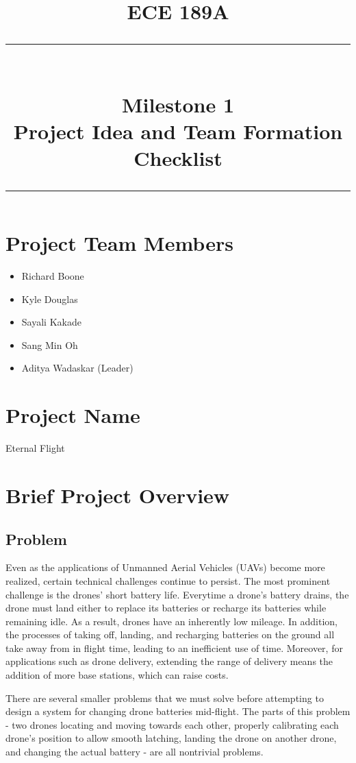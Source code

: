 \documentclass[paper=a4, fontsize=12pt]{scrartcl}
\title{
		\vspace{-0.5in} 	
		\usefont{OT1}{bch}{b}{n}
		\normalfont \normalsize \textsc{ECE 189A} \\ [10pt]
		\rule{\linewidth}{2pt} \\ [0.4cm]
		\huge Milestone 1 \\
		\Large Project Idea and Team Formation Checklist
		\rule{\linewidth}{2pt}
}
\author{
}
\date{}
\begin{document}
\maketitle


\vspace{-1in}
\section{Project Team Members}
\begin{itemize}
	\item Richard Boone
	\item Kyle Douglas
	\item Sayali Kakade
	\item Sang Min Oh
	\item Aditya Wadaskar (Leader)
\end{itemize}

\section{Project Name}
Eternal Flight

\section{Brief Project Overview}
\subsection{Problem}
Even as the applications of Unmanned Aerial Vehicles (UAVs) become more realized, certain technical challenges continue to persist. 
The most prominent challenge is the drones' short battery life. 
Everytime a drone's battery drains, the drone must land either to replace its batteries or recharge its batteries while remaining idle. 
As a result, drones have an inherently low mileage. 
In addition, the processes of taking off, landing, and recharging batteries on the ground all take away from in flight time, leading to an inefficient use of time.
Moreover, for applications such as drone delivery, extending the range of delivery means the addition of more base stations, which can raise costs.

There are several smaller problems that we must solve before attempting to design a system for changing drone batteries mid-flight.
The parts of this problem - two drones locating and moving towards each other, properly calibrating each drone's position to allow smooth latching, landing the drone on another drone, and changing the actual battery - are all nontrivial problems. 
\end{document}
